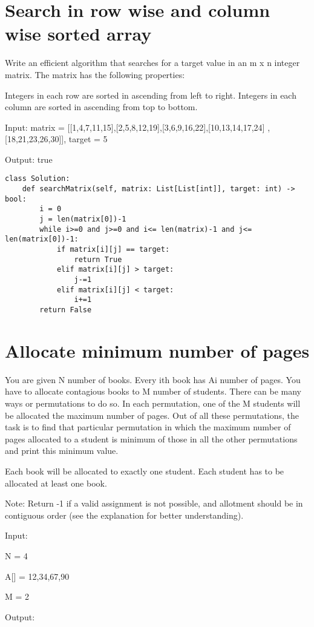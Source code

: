\documentclass[24pt, a4]{article}
\begin{document}
\section{Search in row wise and column wise sorted array}
Write an efficient algorithm that searches for a target value in an m x n 
integer matrix. The matrix has the following properties:

Integers in each row are sorted in ascending from left to right.
Integers in each column are sorted in ascending from top to bottom.

Input: matrix = [[1,4,7,11,15],[2,5,8,12,19],[3,6,9,16,22],[10,13,14,17,24]
,[18,21,23,26,30]], target = 5

Output: true
\begin{lstlisting}
class Solution:
    def searchMatrix(self, matrix: List[List[int]], target: int) -> bool:
        i = 0 
        j = len(matrix[0])-1
        while i>=0 and j>=0 and i<= len(matrix)-1 and j<= len(matrix[0])-1:
            if matrix[i][j] == target:
                return True
            elif matrix[i][j] > target:
                j-=1
            elif matrix[i][j] < target:
                i+=1
        return False
\end{lstlisting}
\newpage
\section{Allocate minimum number of pages}

You are given N number of books. Every ith book has Ai number of pages. 
You have to allocate contagious books to M number of students. There can be 
many ways or permutations to do so. In each permutation, one of the M 
students will be allocated the maximum number of pages. Out of all these 
permutations, the task is to find that particular permutation in which the 
maximum number of pages allocated to a student is minimum of those in all 
the other permutations and print this minimum value. 

Each book will be allocated to exactly one student. Each student has to be 
allocated at least one book.

Note: Return -1 if a valid assignment is not possible, and allotment should 
be in contiguous order (see the explanation for better understanding).

Input:

N = 4

A[] = {12,34,67,90}

M = 2

Output:
\end{document}
